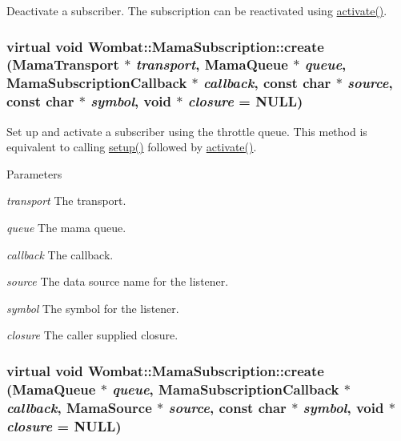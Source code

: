 Deactivate a subscriber. The subscription can be reactivated using \hyperlink{classWombat_1_1MamaSubscription_abe7de53adbc4d0173692bae6073d985d}{activate()}. \hypertarget{classWombat_1_1MamaSubscription_a2ac46ac833f5af07a09457c4eb778196}{
\subsubsection[{create}]{\setlength{\rightskip}{0pt plus 5cm}virtual void Wombat::MamaSubscription::create ({\bf MamaTransport} $\ast$ {\em transport}, \/  {\bf MamaQueue} $\ast$ {\em queue}, \/  {\bf MamaSubscriptionCallback} $\ast$ {\em callback}, \/  const char $\ast$ {\em source}, \/  const char $\ast$ {\em symbol}, \/  void $\ast$ {\em closure} = {\ttfamily NULL})}}
\label{classWombat_1_1MamaSubscription_a2ac46ac833f5af07a09457c4eb778196}


Set up and activate a subscriber using the throttle queue. This method is equivalent to calling \hyperlink{classWombat_1_1MamaSubscription_a856510d1c73d4850c0f069a834cd839d}{setup()} followed by \hyperlink{classWombat_1_1MamaSubscription_abe7de53adbc4d0173692bae6073d985d}{activate()}.


\begin{DoxyParams}{Parameters}
\item[{\em transport}]The transport. \item[{\em queue}]The mama queue. \item[{\em callback}]The callback. \item[{\em source}]The data source name for the listener. \item[{\em symbol}]The symbol for the listener. \item[{\em closure}]The caller supplied closure. \end{DoxyParams}
\hypertarget{classWombat_1_1MamaSubscription_a4c64dd1374448d285990fe754406899a}{
\subsubsection[{create}]{\setlength{\rightskip}{0pt plus 5cm}virtual void Wombat::MamaSubscription::create ({\bf MamaQueue} $\ast$ {\em queue}, \/  {\bf MamaSubscriptionCallback} $\ast$ {\em callback}, \/  {\bf MamaSource} $\ast$ {\em source}, \/  const char $\ast$ {\em symbol}, \/  void $\ast$ {\em closure} = {\ttfamily NULL})}}
\label{classWombat_1_1MamaSubscription_a4c64dd1374448d285990fe754406899a}


